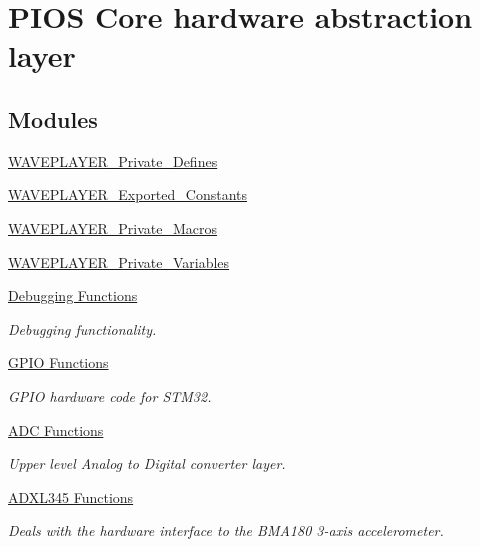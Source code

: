 \hypertarget{group___p_i_o_s}{\section{\-P\-I\-O\-S \-Core hardware abstraction layer}
\label{group___p_i_o_s}
}
\subsection*{\-Modules}
\begin{DoxyCompactItemize}
\item 
\hyperlink{group___w_a_v_e_p_l_a_y_e_r___private___defines}{\-W\-A\-V\-E\-P\-L\-A\-Y\-E\-R\-\_\-\-Private\-\_\-\-Defines}
\item 
\hyperlink{group___w_a_v_e_p_l_a_y_e_r___exported___constants}{\-W\-A\-V\-E\-P\-L\-A\-Y\-E\-R\-\_\-\-Exported\-\_\-\-Constants}
\item 
\hyperlink{group___w_a_v_e_p_l_a_y_e_r___private___macros}{\-W\-A\-V\-E\-P\-L\-A\-Y\-E\-R\-\_\-\-Private\-\_\-\-Macros}
\item 
\hyperlink{group___w_a_v_e_p_l_a_y_e_r___private___variables}{\-W\-A\-V\-E\-P\-L\-A\-Y\-E\-R\-\_\-\-Private\-\_\-\-Variables}
\item 
\hyperlink{group___p_i_o_s___d_e_b_u_g}{\-Debugging Functions}
\begin{DoxyCompactList}\small\item\em \-Debugging functionality. \end{DoxyCompactList}\item 
\hyperlink{group___p_i_o_s___g_p_i_o}{\-G\-P\-I\-O Functions}
\begin{DoxyCompactList}\small\item\em \-G\-P\-I\-O hardware code for \-S\-T\-M32. \end{DoxyCompactList}\item 
\hyperlink{group___p_i_o_s___a_d_c}{\-A\-D\-C Functions}
\begin{DoxyCompactList}\small\item\em \-Upper level \-Analog to \-Digital converter layer. \end{DoxyCompactList}\item 
\hyperlink{group___p_i_o_s___a_d_x_l345}{\-A\-D\-X\-L345 Functions}
\begin{DoxyCompactList}\small\item\em \-Deals with the hardware interface to the \-B\-M\-A180 3-\/axis accelerometer. \end{DoxyCompactList}\item 

\end{DoxyCompactItemize}
